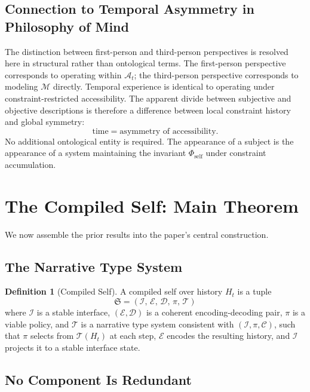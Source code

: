 \documentclass[12pt, a4paper]{article}
\theoremstyle{plain}
\theoremstyle{definition}
\newtheorem{definition}[theorem]{Definition}
\theoremstyle{remark}
\begin{document}
\subsection{Connection to Temporal Asymmetry in Philosophy of Mind}

The distinction between first-person and third-person perspectives is resolved here in structural rather than ontological terms. The first-person perspective corresponds to operating within $\mathcal{A}_t$; the third-person perspective corresponds to modeling $\mathcal{M}$ directly. Temporal experience is identical to operating under constraint-restricted accessibility. The apparent divide between subjective and objective descriptions is therefore a difference between local constraint history and global symmetry:
\[
\text{time} = \text{asymmetry of accessibility}.
\]
No additional ontological entity is required. The appearance of a subject is the appearance of a system maintaining the invariant $\Phi_{\mathrm{self}}$ under constraint accumulation.

\section{The Compiled Self: Main Theorem}

We now assemble the prior results into the paper's central construction.

\subsection{The Narrative Type System}

\begin{definition}[Compiled Self]
A compiled self over history $H_t$ is a tuple
\[
\mathfrak{S} = (\mathcal{I},\, \mathcal{E},\, \mathcal{D},\, \pi,\, \mathcal{T})
\]
where $\mathcal{I}$ is a stable interface, $(\mathcal{E}, \mathcal{D})$ is a coherent encoding-decoding pair, $\pi$ is a viable policy, and $\mathcal{T}$ is a narrative type system consistent with $(\mathcal{I}, \pi, \mathcal{C})$, such that $\pi$ selects from $\mathcal{T}(H_t)$ at each step, $\mathcal{E}$ encodes the resulting history, and $\mathcal{I}$ projects it to a stable interface state.
\end{definition}

\subsection{No Component Is Redundant}
\end{document}
